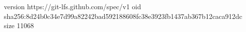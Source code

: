 version https://git-lfs.github.com/spec/v1
oid sha256:8d24b0c34e7d99a82242bad592188608fc38e3923fb1437ab367b12caca912dc
size 11068
